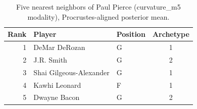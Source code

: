 \begin{table}[htbp]
  \centering\small
  \begin{tabular}{rllc}
    \toprule
    Rank & Player & Position & Archetype \\
    \midrule
    1 & DeMar DeRozan & G & 1 \\
    2 & J.R. Smith & G & 2 \\
    3 & Shai Gilgeous-Alexander & G & 1 \\
    4 & Kawhi Leonard & F & 1 \\
    5 & Dwayne Bacon & G & 2 \\
    \bottomrule
  \end{tabular}
  \caption{Five nearest neighbors of Paul Pierce (curvature_m5 modality), Procrustes-aligned posterior mean.}
  \label{tab:Paul_Pierce_neighbors_curvature_m5}
\end{table}

